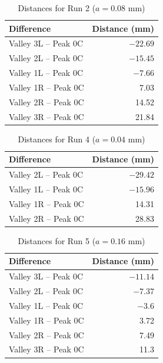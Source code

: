 \newpage
\begin{table}[ht!]
    \centering
    \begin{tabular}{|l|r|}
        \hline
        Difference & Distance (mm) \\
        \hline
        Valley 3L -- Peak 0C & $-22.69$ \\
        Valley 2L -- Peak 0C & $-15.45$ \\
        Valley 1L -- Peak 0C & $-7.66$ \\
        \hline
        Valley 1R -- Peak 0C & 7.03 \\
        Valley 2R -- Peak 0C & 14.52 \\
        Valley 3R -- Peak 0C & 21.84 \\
        \hline
    \end{tabular}
    \caption{Distances for Run 2 ($a = 0.08$ mm)}
    \label{tablel.11.dis.12}
\end{table}
\begin{table}[ht!]
    \centering
    \begin{tabular}{|l|r|}
        \hline
        Difference & Distance (mm) \\
        \hline
        Valley 2L -- Peak 0C & $-29.42$ \\
        Valley 1L -- Peak 0C & $-15.96$ \\
        \hline
        Valley 1R -- Peak 0C & 14.31 \\
        Valley 2R -- Peak 0C & 28.83 \\
        \hline
    \end{tabular}
    \caption{Distances for Run 4 ($a = 0.04$ mm)}
    \label{tablel.11.dis.34}
\end{table}
\begin{table}[ht!]
    \centering
    \begin{tabular}{|l|r|}
        \hline
        Difference & Distance (mm) \\
        \hline
        Valley 3L -- Peak 0C & $-11.14$ \\
        Valley 2L -- Peak 0C & $-7.37$ \\
        Valley 1L -- Peak 0C & $-3.6$ \\
        \hline
        Valley 1R -- Peak 0C & 3.72 \\
        Valley 2R -- Peak 0C & 7.49 \\
        Valley 3R -- Peak 0C & 11.3 \\
        \hline
    \end{tabular}
    \caption{Distances for Run 5 ($a = 0.16$ mm)}
    \label{tablel.11.dis.56}
\end{table}
